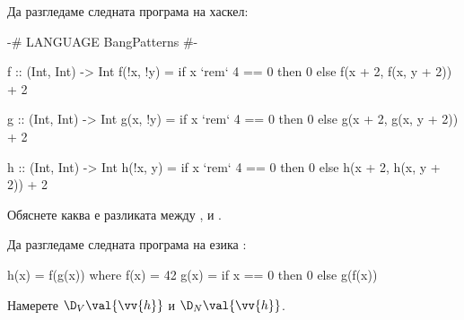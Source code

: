 \begin{problem}
  Да разгледаме следната програма на хаскел:

  \begin{haskellcode}
    {-# LANGUAGE BangPatterns #-}

    f :: (Int, Int) -> Int
    f(!x, !y) = if x `rem` 4 == 0 then 0 
                  else f(x + 2, f(x, y + 2)) + 2

    g :: (Int, Int) -> Int
    g(x, !y) = if x `rem` 4 == 0 then 0 
                 else g(x + 2, g(x, y + 2)) + 2

    h :: (Int, Int) -> Int
    h(!x, y) = if x `rem` 4 == 0 then 0 
                 else h(x + 2, h(x, y + 2)) + 2
  \end{haskellcode}
  Обяснете каква е разликата между ,  и .
\end{problem}


\begin{problem}
  Да разгледаме следната програма на езика \REC:
  \begin{haskellcode}
  h(x) = f(g(x)) where 
    f(x) = 42 
    g(x) = if x == 0 then 0 else g(f(x))
  \end{haskellcode}
  Намерете $\D_V\val{\vv{h}}$ и $\D_N\val{\vv{h}}$.
\end{problem}





